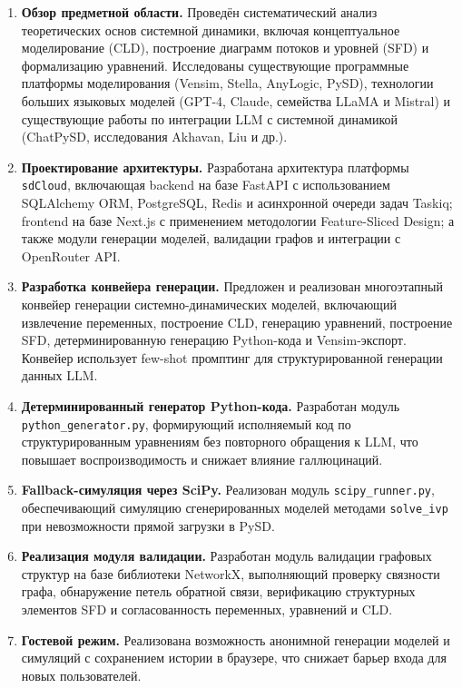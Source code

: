 \begin{enumerate}
    \item \textbf{Обзор предметной области.} Проведён систематический анализ теоретических основ системной динамики, включая концептуальное моделирование (CLD), построение диаграмм потоков и уровней (SFD) и формализацию уравнений. Исследованы существующие программные платформы моделирования (Vensim, Stella, AnyLogic, PySD), технологии больших языковых моделей (GPT-4, Claude, семейства LLaMA и Mistral) и существующие работы по интеграции LLM с системной динамикой (ChatPySD, исследования Akhavan, Liu и др.).

    \item \textbf{Проектирование архитектуры.} Разработана архитектура платформы \texttt{sdCloud}, включающая backend на базе FastAPI с использованием SQLAlchemy ORM, PostgreSQL, Redis и асинхронной очереди задач Taskiq; frontend на базе Next.js с применением методологии Feature-Sliced Design; а также модули генерации моделей, валидации графов и интеграции с OpenRouter API.

    \item \textbf{Разработка конвейера генерации.} Предложен и реализован многоэтапный конвейер генерации системно-динамических моделей, включающий извлечение переменных, построение CLD, генерацию уравнений, построение SFD, детерминированную генерацию Python-кода и Vensim-экспорт. Конвейер использует few-shot промптинг для структурированной генерации данных LLM.

    \item \textbf{Детерминированный генератор Python-кода.} Разработан модуль \texttt{python\_generator.py}, формирующий исполняемый код по структурированным уравнениям без повторного обращения к LLM, что повышает воспроизводимость и снижает влияние галлюцинаций.

    \item \textbf{Fallback-симуляция через SciPy.} Реализован модуль \texttt{scipy\_runner.py}, обеспечивающий симуляцию сгенерированных моделей методами \texttt{solve\_ivp} при невозможности прямой загрузки в PySD.

    \item \textbf{Реализация модуля валидации.} Разработан модуль валидации графовых структур на базе библиотеки NetworkX, выполняющий проверку связности графа, обнаружение петель обратной связи, верификацию структурных элементов SFD и согласованность переменных, уравнений и CLD.

    \item \textbf{Гостевой режим.} Реализована возможность анонимной генерации моделей и симуляций с сохранением истории в браузере, что снижает барьер входа для новых пользователей.


\end{enumerate}
